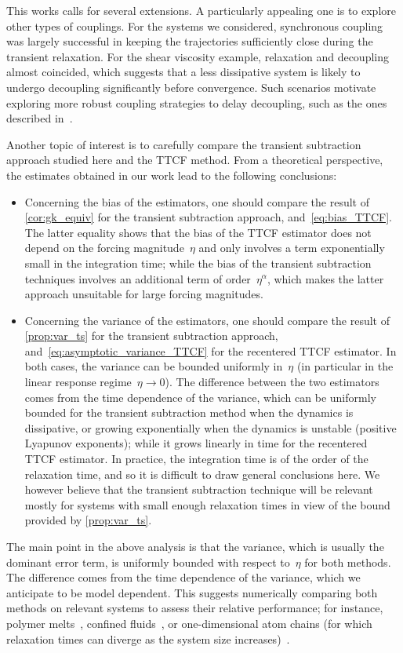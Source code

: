 \documentclass[11pt]{article}
\theoremstyle{definition}
\begin{document}
This works calls for several extensions. A particularly appealing one is to explore other types of couplings. For the systems we considered, synchronous coupling was largely successful in keeping the trajectories sufficiently close during the transient relaxation. For the shear viscosity example, relaxation and decoupling almost coincided, which suggests that a less dissipative system is likely to undergo decoupling significantly before convergence. Such scenarios motivate exploring more robust coupling strategies to delay decoupling, such as the ones described in~\cite{guillin2012,monmarche2024,chak2024,darshan2024}. 

Another topic of interest is to carefully compare the transient subtraction approach studied here and the TTCF method. From a theoretical perspective, the estimates obtained in our work lead to the following conclusions:
\begin{itemize}
\item Concerning the bias of the estimators, one should compare the result of \cref{cor:gk_equiv} for the transient subtraction approach, and~\eqref{eq:bias_TTCF}. The latter equality shows that the bias of the TTCF estimator does not depend on the forcing magnitude~$\eta$ and only involves a term exponentially small in the integration time; while the bias of the transient subtraction techniques involves an additional term of order~$\eta^\alpha$, which makes the latter approach unsuitable for large forcing magnitudes.
\item Concerning the variance of the estimators, one should compare the result of \cref{prop:var_ts} for the transient subtraction approach, and~\eqref{eq:asymptotic_variance_TTCF} for the recentered TTCF estimator. In both cases, the variance can be bounded uniformly in~$\eta$ (in particular in the linear response regime~$\eta \to 0$). The difference between the two estimators comes from the time dependence of the variance, which can be uniformly bounded for the transient subtraction method when the dynamics is dissipative, or growing exponentially when the dynamics is unstable (positive Lyapunov exponents); while it grows linearly in time for the recentered TTCF estimator. In practice, the integration time is of the order of the relaxation time, and so it is difficult to draw general conclusions here. We however believe that the transient subtraction technique will be relevant mostly for systems with small enough relaxation times in view of the bound provided by \cref{prop:var_ts}.
\end{itemize}
The main point in the above analysis is that the variance, which is usually the dominant error term, is uniformly bounded with respect to~$\eta$ for both methods. The difference comes from the time dependence of the variance, which we anticipate to be model dependent. This suggests numerically comparing both methods on relevant systems to assess their relative performance; for instance, polymer melts~\cite{pan2006}, confined fluids~\cite{bernardi2012, bernardi2016}, or one-dimensional atom chains (for which relaxation times can diverge as the system size increases)~\cite{lepri2003, dhar2008, iubini2020}.
\end{document}
